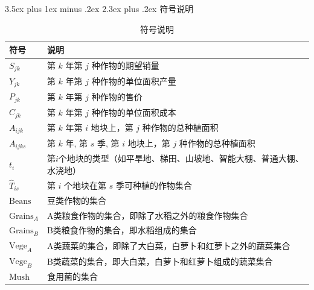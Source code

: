\documentclass[12pt,a4paper]{nmmcm}
\makeatletter
\renewcommand\section{\@startsection{section}{1}{0pt}%
    {3.5ex plus 1ex minus .2ex}%
    {2.3ex plus .2ex}%
    {\normalfont\LARGE\bfseries}}
\makeatother
\begin{document}
\section{符号说明}
\begin{table}[htbp]
  \centering
  \caption{符号说明}
  \renewcommand{\arraystretch}{1.2}
  \setlength{\tabcolsep}{10pt}
  \begin{tabular}{p{3cm} | p{10cm}}
    \hline
    \hline
    \textbf{符号}       & \textbf{说明}                                 \\
    \hline
    $S_{jk}$          & 第 $k$ 年第 $j$ 种作物的期望销量                       \\
    $Y_{jk}$          & 第 $k$ 年第 $j$ 种作物的单位面积产量                     \\
    $P_{jk}$          & 第 $k$ 年第 $j$ 种作物的售价                         \\
    $C_{jk}$          & 第 $k$ 年第 $j$ 种作物的单位面积成本                     \\
    $A_{ijk}$         & 第 $k$ 年第 $i$ 地块上，第 $j$ 种作物的总种植面积            \\
    $A_{ijks}$        & 第 $k$ 年, 第 $s$ 季, 第 $i$ 地块上，第 $j$ 种作物的总种植面积 \\
    $t_i$             & 第$i$个地块的类型（如平旱地、梯田、山坡地、智能大棚、普通大棚、水浇地）       \\
    $\hat{T}_{is}$    & 第 $i$ 个地块在第 $s$ 季可种植的作物集合                   \\
    $\text{Beans}$    & 豆类作物的集合                                     \\
    $\text{Grains}_A$ & A类粮食作物的集合，即除了水稻之外的粮食作物集合                    \\
    $\text{Grains}_B$ & B类粮食作物的集合，即水稻组成的集合                          \\
    $\text{Vege}_A$   & A类蔬菜的集合，即除了大白菜，白萝卜和红萝卜之外的蔬菜集合               \\
    $\text{Vege}_B$   & B类蔬菜的集合，即大白菜，白萝卜和红萝卜组成的蔬菜集合                 \\
    $\text{Mush}$     & 食用菌的集合                                      \\
    \hline
    \hline
  \end{tabular}
\end{table}
\end{document}
